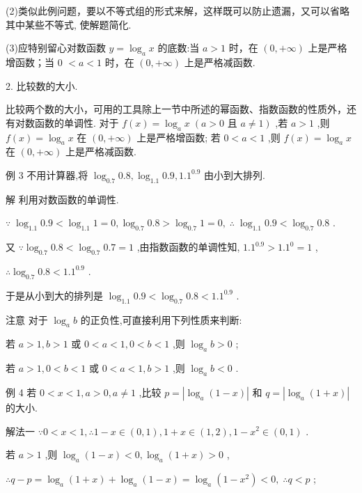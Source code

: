 \documentclass[10pt]{article}
\begin{document}
(2)类似此例问题，要以不等式组的形式来解，这样既可以防止遗漏，又可以省略其中某些不等式, 使解题简化.

(3)应特别留心对数函数 \(y = {\log }_{a}x\) 的底数:当 \(a > 1\) 时，在 \(\left( {0, + \infty }\right)\) 上是严格增函数；当 0 \(< a < 1\) 时，在 \(\left( {0, + \infty }\right)\) 上是严格减函数.

2. 比较数的大小.

比较两个数的大小，可用的工具除上一节中所述的幂函数、指数函数的性质外，还有对数函数的单调性. 对于 \(f\left( x\right)  = {\log }_{a}x\;\left( {a > 0\text{ 且 }a \neq  1}\right)\) ,若 \(a > 1\) ,则 \(f\left( x\right)  = {\log }_{a}x\) 在 \(\left( {0, + \infty }\right)\) 上是严格增函数; 若 \(0 < a < 1\) ,则 \(f\left( x\right)  = {\log }_{a}x\) 在 \(\left( {0, + \infty }\right)\) 上是严格减函数.

例 3 不用计算器,将 \({\log }_{0.7}{0.8},{\log }_{1.1}{0.9},{1.1}^{0.9}\) 由小到大排列.

解 利用对数函数的单调性.

\(\because \;{\log }_{1.1}{0.9} < {\log }_{1.1}1 = 0,{\log }_{0.7}{0.8} > {\log }_{0.7}1 = 0,\;\therefore \;{\log }_{1.1}{0.9} < {\log }_{0.7}{0.8}\) .

又 \(\because {\log }_{0.7}{0.8} < {\log }_{0.7}{0.7} = 1\) ,由指数函数的单调性知, \({1.1}^{0.9} > {1.1}^{0} = 1\) ,

\(\therefore {\log }_{0.7}{0.8} < {1.1}^{0.9}\) .

于是从小到大的排列是 \({\log }_{1.1}{0.9} < {\log }_{0.7}{0.8} < {1.1}^{0.9}\) .

注意 对于 \({\log }_{a}b\) 的正负性,可直接利用下列性质来判断:

若 \(a > 1,b > 1\) 或 \(0 < a < 1,0 < b < 1\) ,则 \({\log }_{a}b > 0\) ;

若 \(a > 1,0 < b < 1\) 或 \(0 < a < 1,b > 1\) ,则 \({\log }_{a}b < 0\) .

例 4 若 \(0 < x < 1,a > 0,a \neq  1\) ,比较 \(p = \left| {{\log }_{a}\left( {1 - x}\right) }\right|\) 和 \(q = \left| {{\log }_{a}\left( {1 + x}\right) }\right|\) 的大小.

解法一 \(\because 0 < x < 1,\therefore 1 - x \in  \left( {0,1}\right) ,1 + x \in  \left( {1,2}\right) ,1 - {x}^{2} \in  \left( {0,1}\right)\) .

若 \(a > 1\) ,则 \({\log }_{a}\left( {1 - x}\right)  < 0,{\log }_{a}\left( {1 + x}\right)  > 0\) ,

\(\therefore q - p = {\log }_{a}\left( {1 + x}\right)  + {\log }_{a}\left( {1 - x}\right)  = {\log }_{a}\left( {1 - {x}^{2}}\right)  < 0,\;\therefore q < p\) ;
\end{document}
